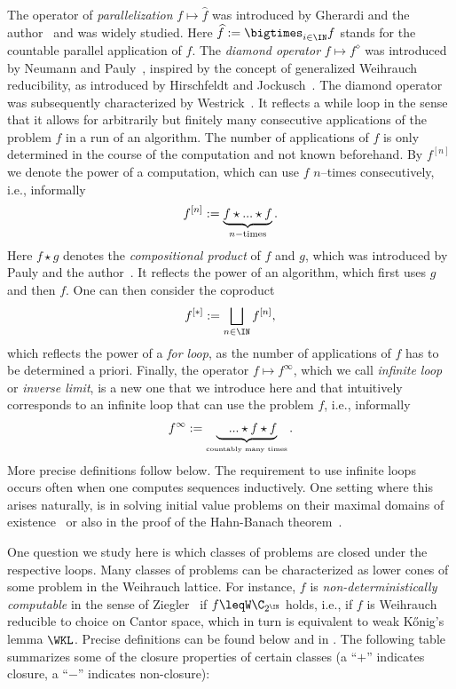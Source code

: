 \documentclass{lmcs}
\begin{document}
\noindent
The operator of {\em parallelization} $f\mapsto\widehat{f}$ was introduced by Gherardi and the author~\cite{BG11} and was widely studied.
Here $\widehat{f}:=\bigtimes_{i\in\IN}f$ stands for the countable parallel application of $f$.
The {\em diamond operator} $f\mapsto f^\diamond$ was introduced by Neumann and Pauly~\cite{NP18}, inspired by the concept of generalized Weihrauch
reducibility, as introduced by Hirschfeldt and Jockusch~\cite{HJ16}.
The diamond operator was subsequently characterized by Westrick~\cite{Wes21}. It reflects a while loop in the sense that it allows for
arbitrarily but finitely many consecutive applications of the problem $f$ in a run of an algorithm.
The number of applications of $f$ is only determined in the course of the computation and not known beforehand.
By $f^{[n]}$ we denote the power of a computation, which can use $f$ $n$--times consecutively, i.e., informally
\[f^{[n]}:=\underbrace{f\star ...\star f}_{n\rm-times}.\]
Here $f\star g$ denotes the {\em compositional product} of $f$ and $g$, which was introduced by  Pauly and the author~\cite{BP18}.
It reflects the power of an algorithm, which first uses $g$ and then $f$.
One can then consider the coproduct 
\[f^{[*]}:=\bigsqcup_{n\in\IN}f^{[n]},\] 
which reflects the power of a {\em for loop}, as the number of applications of $f$
has to be determined a priori.
Finally, the operator $f\mapsto f^\infty$, which we call {\em infinite loop} or {\em inverse limit}, is a new one that we introduce here and 
that intuitively corresponds to an infinite loop that can use the problem $f$, i.e., informally
\[f^\infty:=\underbrace{\quad...\star f \star f}_{\mbox{\tiny countably many times}}.\]
More precise definitions follow below.
The requirement to use infinite loops occurs often when one computes sequences inductively. 
One setting where this arises naturally, is in solving initial value problems on their maximal domains of existence~\cite{BS25} or also in the proof of the Hahn-Banach theorem~\cite{BS26}.

One question we study here is which classes of problems are closed under the respective loops.
Many classes of problems can be characterized as lower cones of some problem in the Weihrauch lattice.
For instance, $f$ is {\em non-deterministically computable} in the sense of Ziegler~\cite{Zie07} if $f\leqW\C_{2^\IN}$ holds, i.e.,
if $f$ is Weihrauch reducible to choice on Cantor space, which in turn is equivalent to weak K\H{o}nig's lemma $\WKL$.
Precise definitions can be found below and in \cite{BGP21}.
The following table summarizes some of the closure properties of certain classes (a ``$+$'' indicates closure, a ``$-$'' indicates non-closure):
\end{document}
